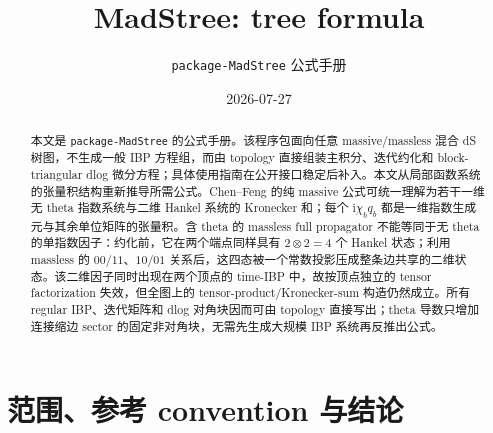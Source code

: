 \documentclass[11pt,a4paper]{ctexart}
\title{MadStree: tree formula}
\author{\texttt{package-MadStree} 公式手册}
\date{2026-07-27}
\newcommand{\ii}{\mathrm i}
\begin{document}
\maketitle

\begin{abstract}
本文是 \texttt{package-MadStree} 的公式手册。该程序包面向任意 massive/massless 混合 dS 树图，不生成一般 IBP 方程组，而由 topology 直接组装主积分、迭代约化和 block-triangular dlog 微分方程；具体使用指南在公开接口稳定后补入。本文从局部函数系统的张量积结构重新推导所需公式。Chen--Feng 的纯 massive 公式可统一理解为若干一维无 theta 指数系统与二维 Hankel 系统的 Kronecker 和；每个 $\ii\chi_bq_b$ 都是一维指数生成元与其余单位矩阵的张量积。含 theta 的 massless full propagator 不能等同于无 theta 的单指数因子：约化前，它在两个端点同样具有 $2\otimes2=4$ 个 Hankel 状态；利用 massless 的 $00/11$、$10/01$ 关系后，这四态被一个常数投影压成整条边共享的二维状态。该二维因子同时出现在两个顶点的 time-IBP 中，故按顶点独立的 tensor factorization 失效，但全图上的 tensor-product/Kronecker-sum 构造仍然成立。所有 regular IBP、迭代矩阵和 dlog 对角块因而可由 topology 直接写出；theta 导数只增加连接缩边 sector 的固定非对角块，无需先生成大规模 IBP 系统再反推出公式。
\end{abstract}

\tableofcontents

\section{范围、参考 convention 与结论}
\end{document}
